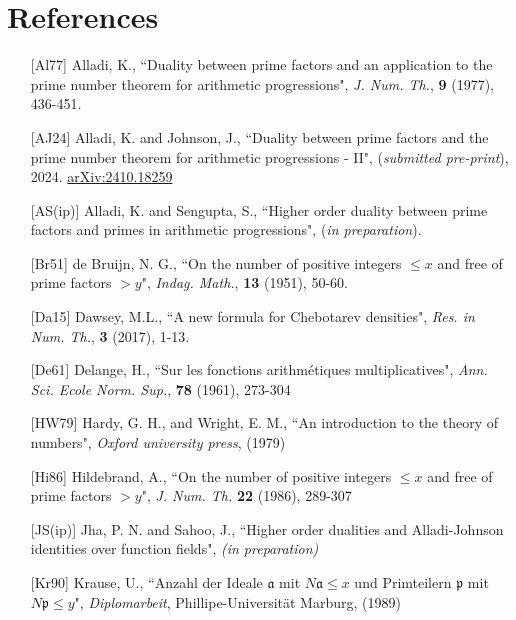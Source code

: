 \documentclass[12pt]{article}
\numberwithin{equation}{section}
\numberwithin{equation}{section}
\begin{document}
\section{References}
\begin{enumerate}
    \item[{[Al77]}] Alladi, K., ``Duality between prime factors and an application to the prime number theorem for arithmetic progressions", \textit{J. Num. Th.}, \textbf{9} (1977), 436-451.
    \item[{[AJ24]}] Alladi, K. and Johnson, J., ``Duality between prime factors and the prime number theorem for arithmetic progressions - II", (\textit{submitted pre-print}), 2024. \href{https://nam10.safelinks.protection.outlook.com/?url=http%3A%2F%2Farxiv.org%2Fabs%2F2410.18259&data=05%7C02%7Csengupta.s%40ufl.edu%7Cbb6e0dfda02940b30dbb08dcf7758568%7C0d4da0f84a314d76ace60a62331e1b84%7C0%7C0%7C638657331341043920%7CUnknown%7CTWFpbGZsb3d8eyJWIjoiMC4wLjAwMDAiLCJQIjoiV2luMzIiLCJBTiI6Ik1haWwiLCJXVCI6Mn0%3D%7C0%7C%7C%7C&sdata=YQy1HVSyFY7D%2F13FeVYxRe5BIEnZ%2BmAsVQuJ4xLqiOY%3D&reserved=0}{arXiv:2410.18259} 
    \item[{[AS(ip)]}] Alladi, K. and Sengupta, S., ``Higher order duality between prime factors and primes in arithmetic progressions", (\textit{in preparation}). 
    \item[{[Br51]}]  de Bruijn, N. G., ``On the number of positive integers $\leq x$ and free of prime factors $>y$", \textit{Indag. Math.}, \textbf{13} (1951), 50-60.
    \item[{[Da15]}] Dawsey, M.L., ``A new formula for Chebotarev densities", \textit{Res. in Num. Th.}, \textbf{3} (2017), 1-13. 
    \item[{[De61]}] Delange, H., ``Sur les fonctions arithm\'etiques multiplicatives", \textit{Ann. Sci. Ecole Norm. Sup.}, \textbf{78} (1961), 273-304 
    \item[{[HW79]}] Hardy, G. H., and Wright, E. M., ``An introduction to the theory of numbers", \textit{Oxford university press}, (1979) 
    \item[{[Hi86]}] Hildebrand, A., ``On the number of positive integers $\leq x$ and free of prime factors $>y$", \textit{J. Num. Th.} \textbf{22} (1986), 289-307 
    \item[{[JS(ip)]}] Jha, P. N. and Sahoo, J., ``Higher order dualities and Alladi-Johnson identities over function fields", \textit{(in preparation)} 
    \item[{[Kr90]}] Krause, U., ``Anzahl der Ideale $\mathfrak{a}$ mit $N\mathfrak{a}\leq x$ und Primteilern $\mathfrak{p}$ mit $N\mathfrak{p}\leq y$", \textit{Diplomarbeit}, Phillipe-Universit\"at Marburg, (1989)  

\end{enumerate}
\end{document}
